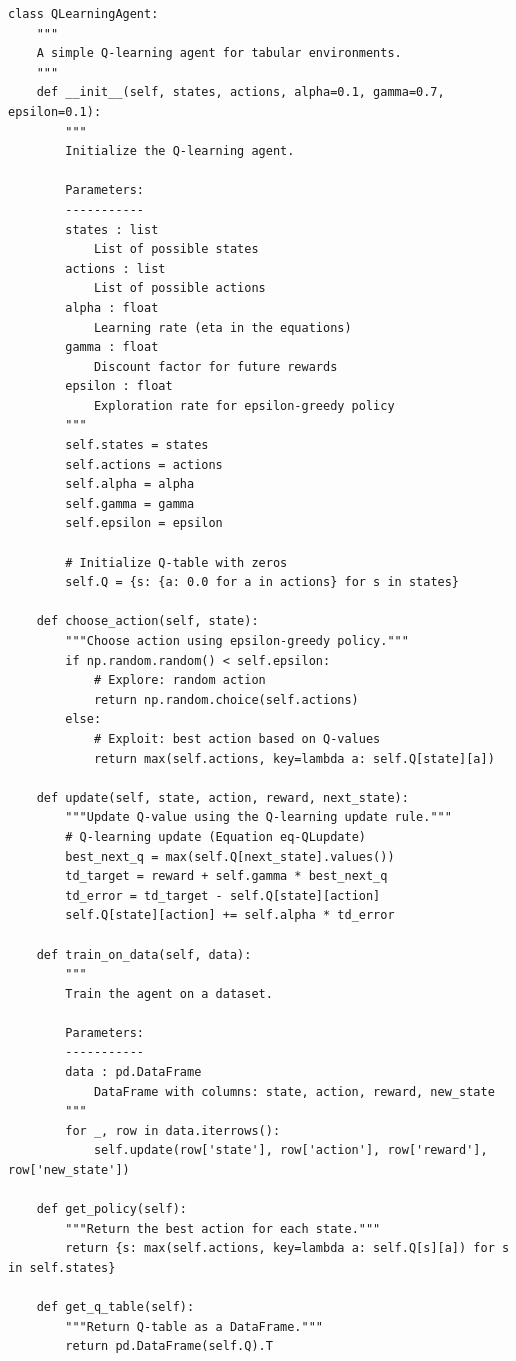 \begin{verbatim}
class QLearningAgent:
    """
    A simple Q-learning agent for tabular environments.
    """
    def __init__(self, states, actions, alpha=0.1, gamma=0.7, epsilon=0.1):
        """
        Initialize the Q-learning agent.
        
        Parameters:
        -----------
        states : list
            List of possible states
        actions : list
            List of possible actions
        alpha : float
            Learning rate (eta in the equations)
        gamma : float
            Discount factor for future rewards
        epsilon : float
            Exploration rate for epsilon-greedy policy
        """
        self.states = states
        self.actions = actions
        self.alpha = alpha
        self.gamma = gamma
        self.epsilon = epsilon
        
        # Initialize Q-table with zeros
        self.Q = {s: {a: 0.0 for a in actions} for s in states}
    
    def choose_action(self, state):
        """Choose action using epsilon-greedy policy."""
        if np.random.random() < self.epsilon:
            # Explore: random action
            return np.random.choice(self.actions)
        else:
            # Exploit: best action based on Q-values
            return max(self.actions, key=lambda a: self.Q[state][a])
    
    def update(self, state, action, reward, next_state):
        """Update Q-value using the Q-learning update rule."""
        # Q-learning update (Equation eq-QLupdate)
        best_next_q = max(self.Q[next_state].values())
        td_target = reward + self.gamma * best_next_q
        td_error = td_target - self.Q[state][action]
        self.Q[state][action] += self.alpha * td_error
    
    def train_on_data(self, data):
        """
        Train the agent on a dataset.
        
        Parameters:
        -----------
        data : pd.DataFrame
            DataFrame with columns: state, action, reward, new_state
        """
        for _, row in data.iterrows():
            self.update(row['state'], row['action'], row['reward'], row['new_state'])
    
    def get_policy(self):
        """Return the best action for each state."""
        return {s: max(self.actions, key=lambda a: self.Q[s][a]) for s in self.states}
    
    def get_q_table(self):
        """Return Q-table as a DataFrame."""
        return pd.DataFrame(self.Q).T
\end{verbatim}

